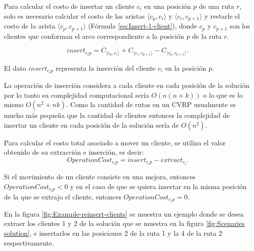 \documentclass[12pt]{report}
\begin{document}
	Para calcular el costo de insertar un cliente $c_i$ en una posición $p$ de una ruta $r$, solo es necesario calcular el costo de las aristas $\langle c_p,c_i \rangle$ y $\langle c_i,c_{p+1} \rangle$ y restarle el costo de la arista $\langle c_p,c_{p+1} \rangle$ (Fórmula \ref{eq:Insert-1-client}), donde $c_p$ y $c_{p+1}$ son los clientes que conforman el arco correspondiente a la posición $p$ de la ruta $r$.

	\begin{equation}
		insert_{c_ip} = C_{\langle c_p,c_i \rangle} + C_{\langle c_i,c_{p+1} \rangle} - C_{\langle c_p,c_{p+1} \rangle}\textit{.}
		\label{eq:Insert-1-client}
	\end{equation}

	El dato $insert_{c_ip}$ representa la inserción del cliente $c_i$ en la posición $p$.

	La operación de inserción considera a cada cliente en cada posición de la solución por lo tanto su complejidad computacional sería $O(n(n+k))$ o lo que es lo mismo $O(n^2 + nk)$. Como la cantidad de rutas en un CVRP usualmente es mucho más pequeña que la cantidad de clientes entonces la complejidad de insertar un cliente en cada posición de la solución sería de $O(n^2)$.

	Para calcular el costo total asociado a mover un cliente, se utiliza el valor obtenido de su extracción e inserción, es decir:
	 \begin{equation}
	 	OperationCost_{c_ip} = insert_{c_ip} - extract_{c_i}.
	 	\label{eq:OperationCost-1-client}
              \end{equation}

	Si el movimiento de un cliente consiste en una mejora, entonces $OperationCost_{c_ip} < 0$ y en el caso de que se quiera insertar en la misma posición de la que se extrajo el cliente, entonces $OperationCost_{c_ip} = 0$.

	En la figura \ref{fig:Example-reinsert-clients} se muestra un ejemplo donde se desea extraer los clientes 1 y 2 de la solución que se muestra en la figura \ref{fig:Scenaries solution}, e insertarlos en las posiciones 2 de la ruta 1 y la 4 de la ruta 2 respectivamente.
\end{document}
